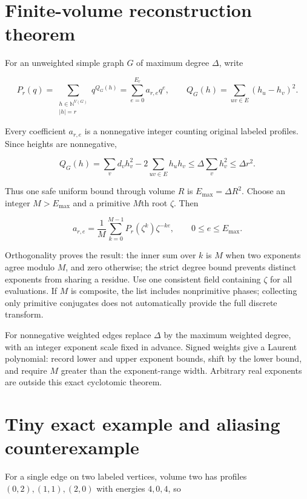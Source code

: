 \documentclass[
  11pt,
  a4paper,
]{report}
\begin{document}
\hypertarget{finite-volume-reconstruction-theorem}{%
\section{Finite-volume reconstruction
theorem}\label{finite-volume-reconstruction-theorem}}

For an unweighted simple graph \(G\) of maximum degree \(\Delta\), write

\[
P_r(q)=\sum_{\substack{h\in\mathbb N^{V(G)}\\ |h|=r}}q^{Q_G(h)}
=\sum_{e=0}^{E_r}a_{r,e}q^e,\qquad
Q_G(h)=\sum_{uv\in E}(h_u-h_v)^2.
\]

Every coefficient \(a_{r,e}\) is a nonnegative integer counting original
labeled profiles. Since heights are nonnegative,

\[
Q_G(h)=\sum_v d_vh_v^2-2\sum_{uv\in E}h_uh_v
\le\Delta\sum_vh_v^2\le\Delta r^2.
\]

Thus one safe uniform bound through volume \(R\) is
\(E_{\max}=\Delta R^2\). Choose an integer \(M>E_{\max}\) and a
primitive \(M\)th root \(\zeta\). Then

\[
a_{r,e}=\frac1M\sum_{k=0}^{M-1}P_r(\zeta^k)\zeta^{-ke},
\qquad 0\le e\le E_{\max}.
\]

Orthogonality proves the result: the inner sum over \(k\) is \(M\) when
two exponents agree modulo \(M\), and zero otherwise; the strict degree
bound prevents distinct exponents from sharing a residue. Use one
consistent field containing \(\zeta\) for all evaluations. If \(M\) is
composite, the list includes nonprimitive phases; collecting only
primitive conjugates does not automatically provide the full discrete
transform.

For nonnegative weighted edges replace \(\Delta\) by the maximum
weighted degree, with an integer exponent scale fixed in advance. Signed
weights give a Laurent polynomial: record lower and upper exponent
bounds, shift by the lower bound, and require \(M\) greater than the
exponent-range width. Arbitrary real exponents are outside this exact
cyclotomic theorem.

\hypertarget{tiny-exact-example-and-aliasing-counterexample}{%
\section{Tiny exact example and aliasing
counterexample}\label{tiny-exact-example-and-aliasing-counterexample}}

For a single edge on two labeled vertices, volume two has profiles
\((0,2),(1,1),(2,0)\) with energies \(4,0,4\), so
\end{document}
